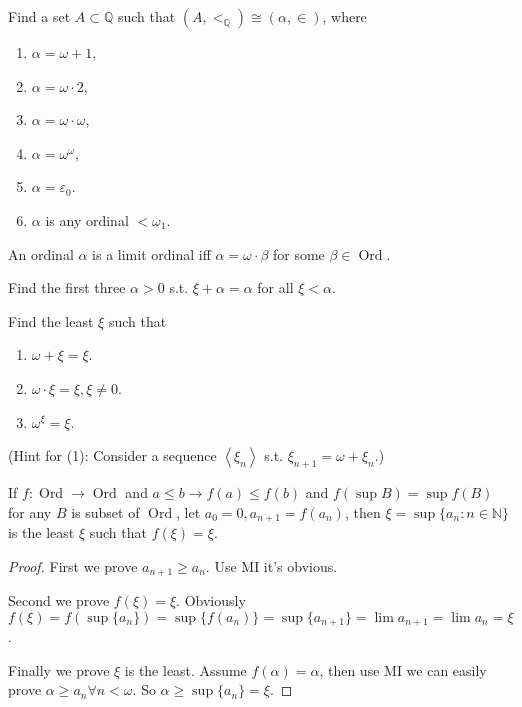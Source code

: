 \documentclass{ctexart}
\DeclareMathOperator{\ord}{Ord}
\newcommand{\N}{\mathbb{N}}
\begin{document}
\begin{problem}
Find a set $A \subset \mathbb{Q}$ such that $\left(A,<_{\mathbb{Q}}\right) \cong(\alpha, \in)$, where
\begin{enumerate}[label=\alph*,ref=\theproblem.\alph*]
\item  $\alpha=\omega+1$,
\item  $\alpha=\omega \cdot 2$,
\item  $\alpha=\omega \cdot \omega$,
\item  $\alpha=\omega^\omega$,
\item  $\alpha=\varepsilon_0$.
\item  $\alpha$ is any ordinal $<\omega_1$.
\end{enumerate}
\end{problem}



\begin{problem}
An ordinal $\alpha$ is a limit ordinal iff $\alpha=\omega \cdot \beta$ for some $\beta \in\ord$.
\end{problem}



\begin{problem}
Find the first three $\alpha>0$ s.t. $\xi+\alpha=\alpha$ for all $\xi<\alpha$.
\end{problem}



\begin{problem}
Find the least $\xi$ such that
\begin{enumerate}[label=\alph*,ref=\theproblem.\alph*]
\item  $\omega+\xi=\xi$.
\item  $\omega \cdot \xi=\xi, \xi \neq 0$.
\item  $\omega^{\xi}=\xi$.
\end{enumerate}
(Hint for (1): Consider a sequence $\left\langle\xi_n\right\rangle$ s.t. $\xi_{n+1}=\omega+\xi_n$.)
\end{problem}
\begin{lemma}\label{lem:f}
If $f:\ord\to\ord$ and $a\leq b\to f(a)\leq f(b)$ and $f(\sup B)=\sup f(B)$ for any $B$ is subset of $\ord$, let $a_0=0,a_{n+1}=f(a_n)$, then $\xi=\sup\{a_n:n\in\N\}$ is the least $\xi$ such that $f(\xi)=\xi$.
\end{lemma}
\begin{proof}
First we prove $a_{n+1}\geq a_n$. Use MI it's obvious.

Second we prove $f(\xi)=\xi$. Obviously $f(\xi)=f(\sup\{a_n\})=\sup\{f(a_n)\}=\sup\{a_{n+1}\}=\lim a_{n+1}=\lim a_n=\xi$.

Finally we prove $\xi$ is the least. Assume $f(\alpha)=\alpha$, then use MI we can easily prove $\alpha\geq a_n\forall n<\omega$. So $\alpha\geq \sup\{a_n\}=\xi$.
\end{proof}
\end{document}
